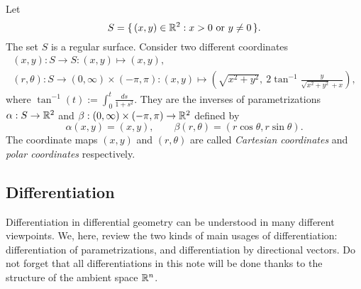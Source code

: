 \documentclass{../exp}
\def\a{\alpha}
\begin{document}
\begin{ex}
Let
\[S=\{\,(x,y)\in\mathbb{R}^2:x>0\text{ or }y\ne0\,\}.\]
The set $S$ is a regular surface.
Consider two different coordinates
\begin{gather*}
(x,y):S\to S:(x,y)\mapsto(x,y),\\
(r,\theta):S\to(0,\infty)\times(-\pi,\pi):(x,y)\mapsto\left(\sqrt{x^2+y^2},\ 2\tan^{-1}\frac y{\sqrt{x^2+y^2}+x}\right),
\end{gather*}
where $\tan^{-1}(t):=\int_0^t\frac{ds}{1+s^2}$.
They are the inverses of parametrizations $\a:S\to\R^2$ and $\beta:(0,\infty)\times(-\pi,\pi)\to\R^2$ defined by
\[\a(x,y)=(x,y),\qquad\beta(r,\theta)=(r\cos\theta,r\sin\theta).\]
The coordinate maps $(x,y)$ and $(r,\theta)$ are called \emph{Cartesian coordinates} and \emph{polar coordinates} respectively.
\end{ex}

 


\subsection{Differentiation}
Differentiation in differential geometry can be understood in many different viewpoints.
We, here, review the two kinds of main usages of differentiation: differentiation of parametrizations, and differentiation by directional vectors.
Do not forget that all differentiations in this note will be done thanks to the structure of the ambient space $\mathbb{R}^n$.
\end{document}
